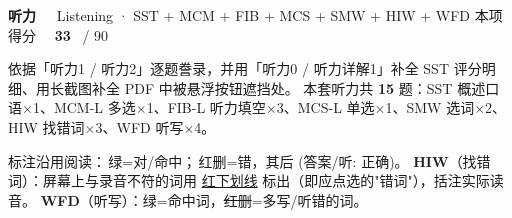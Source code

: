 \documentclass[11pt]{article}
\newcommand{\ptesection}[3]{%
  \needspace{6\baselineskip}
  \begin{tcolorbox}[enhanced, colback=cAccent, colframe=cAccent, sharp corners,
     left=14pt, right=14pt, top=10pt, bottom=10pt, boxrule=0pt]
    {\fontsize{20}{24}\selectfont\bfseries\color{white} #1\ \ }%
    {\large\color{white!85} #2}\hfill
    {\large\color{white}本项得分\ \ }{\fontsize{22}{24}\selectfont\bfseries\color{white} #3}%
    \ {\color{white!85}/ 90}
  \end{tcolorbox}}
\begin{document}
\ptesection{听力}{Listening · SST + MCM + FIB + MCS + SMW + HIW + WFD}{33}

\vspace{1mm}
{\small\color{gray} 依据「听力1 / 听力2」逐题誊录，并用「听力0 / 听力详解1」补全 SST 评分明细、用长截图补全 PDF 中被悬浮按钮遮挡处。
本套听力共 \textbf{15} 题：SST 概述口语$\times$1、MCM-L 多选$\times$1、FIB-L 听力填空$\times$3、MCS-L 单选$\times$1、SMW 选词$\times$2、HIW 找错词$\times$3、WFD 听写$\times$4。}
\vspace{1mm}

\begin{notebox}
{\footnotesize 标注沿用阅读：{\color{cFix}\,绿=对/命中}；{\color{cWrong}\,红删=错}，其后 {\color{cFix}(答案/听: 正确)}。
\textbf{HIW}（找错词）：屏幕上与录音不符的词用 {\color{cWrong}\uline{红下划线}} 标出（即应点选的"错词"），括注实际读音。
\textbf{WFD}（听写）：{\color{cFix}绿}=命中词，{\color{cWrong}\sout{红删}}=多写/听错的词。}
\end{notebox}
\end{document}
